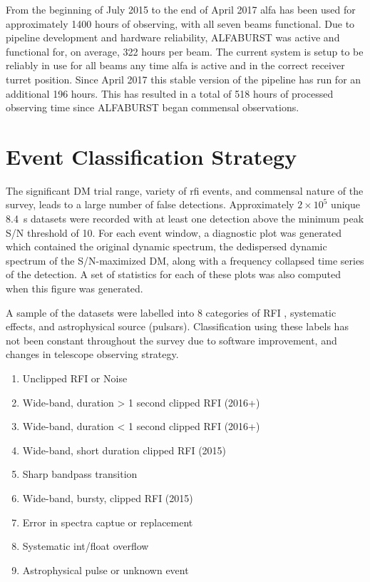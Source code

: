 \documentclass[a4paper,fleqn,usenatbib]{mnras}
\begin{document}
From the beginning of July 2015 to the end of April 2017 \gls{alfa} has been
used for approximately 1400 hours of observing, with all seven beams functional.
Due to pipeline development and hardware reliability, ALFABURST was active and
functional for, on average, 322 hours per beam.  The current system is setup to
be reliably in use for all beams any time \gls{alfa} is active and in the
correct receiver turret position. Since April 2017 this stable version of the
pipeline has run for an additional 196 hours. This has resulted in a total of
518 hours of processed observing time since ALFABURST began commensal observations.



\section{Event Classification Strategy}
\label{sec:event_classify}

The significant DM trial range, variety of \gls{rfi} events, and commensal
nature of the survey, leads to a large number of false detections.
Approximately $2 \times 10^5$ unique 8.4~s datasets were recorded with at least
one detection above the minimum peak S/N threshold of 10. For each event
window, a diagnostic plot was generated which contained the original dynamic
spectrum, the dedispersed dynamic spectrum of the S/N-maximized DM, along with
a frequency collapsed time series of the detection. A set of statistics for
each of these plots was also computed when this figure was generated.


A sample of the datasets were labelled into 8 categories of RFI , systematic
effects, and astrophysical source (pulsars). Classification using these labels
has not been constant throughout the survey due to software improvement, and
changes in telescope observing strategy.

\begin{enumerate}
	\item Unclipped RFI or Noise
	\item Wide-band, duration > 1 second clipped RFI (2016+)
	\item Wide-band, duration < 1 second clipped RFI (2016+)
	\item Wide-band, short duration clipped RFI (2015)
	\item Sharp bandpass transition
	\item Wide-band, bursty, clipped RFI (2015)
	\item Error in spectra captue or replacement
	\item Systematic int/float overflow
	\item Astrophysical pulse or unknown event
\end{enumerate}
\end{document}
